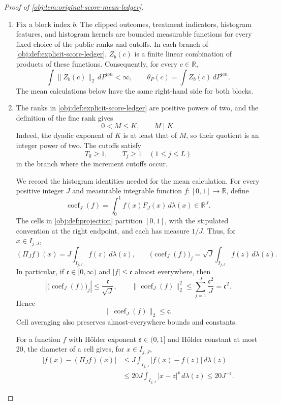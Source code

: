 \documentclass[11pt]{article}
\begin{document}
\begin{proof}[Proof of \cref{obj:lem:original-score-mean-ledger}]
\begin{enumerate}
\item
Fix a block index \(b\). The clipped outcomes, treatment indicators, histogram features, and histogram kernels are bounded measurable functions for every fixed choice of the public ranks and cutoffs. In each branch of \cref{obj:def:explicit-score-ledger}, \(Z_b(c)\) is a finite linear combination of products of these functions. Consequently, for every \(c\in\mathbb R\),
\[
\int \|Z_b(c)\|_2\,dP^{\otimes n}<\infty,
\qquad
\theta_P(c)=\int Z_b(c)\,dP^{\otimes n}.
\]
The mean calculations below have the same right-hand side for both blocks.

\item
The ranks in \cref{obj:def:explicit-score-ledger} are positive powers of two, and the definition of the fine rank gives
\[
0<M\le K,\qquad M\mid K.
\]
Indeed, the dyadic exponent of \(K\) is at least that of \(M\), so their quotient is an integer power of two. The cutoffs satisfy
\[
T_0\ge1,\qquad T_j\ge1\quad(1\le j\le L)
\]
in the branch where the increment cutoffs occur.

We record the histogram identities needed for the mean calculation. For every positive integer \(J\) and measurable integrable function \(f:[0,1]\to\mathbb R\), define
\[
\operatorname{coef}_J(f)
=
\int_0^1 f(x)F_J(x)\,d\lambda(x)\in\mathbb R^J.
\]
The cells in \cref{obj:def:projection} partition \([0,1]\), with the stipulated convention at the right endpoint, and each has measure \(1/J\). Thus, for \(x\in I_{j,J}\),
\[
(\Pi_J f)(x)=J\int_{I_{j,J}}f(z)\,d\lambda(z),
\qquad
\bigl(\operatorname{coef}_J(f)\bigr)_j
=
\sqrt J\int_{I_{j,J}}f(z)\,d\lambda(z).
\]
In particular, if \(\mathfrak c\in[0,\infty)\) and \(|f|\le\mathfrak c\) almost everywhere, then
\[
\left|\bigl(\operatorname{coef}_J(f)\bigr)_j\right|
\le\frac{\mathfrak c}{\sqrt J},
\qquad
\|\operatorname{coef}_J(f)\|_2^2
\le\sum_{j=1}^J\frac{\mathfrak c^2}{J}
=\mathfrak c^2.
\]
Hence
\[
\|\operatorname{coef}_J(f)\|_2\le\mathfrak c.
\]
Cell averaging also preserves almost-everywhere bounds and constants.

For a function \(f\) with Hölder exponent \(\mathfrak s\in(0,1]\) and Hölder constant at most \(20\), the diameter of a cell gives, for \(x\in I_{j,J}\),
\[
\begin{aligned}
|f(x)-(\Pi_Jf)(x)|
&\le J\int_{I_{j,J}}|f(x)-f(z)|\,d\lambda(z)\\
&\le20J\int_{I_{j,J}}|x-z|^{\mathfrak s}\,d\lambda(z)
\le20J^{-\mathfrak s}.
\end{aligned}
\]


\end{enumerate}
\end{proof}
\end{document}
